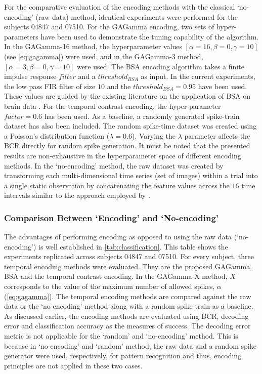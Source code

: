 For the comparative evaluation of the encoding methods with the classical `no-encoding' (raw data) method, identical experiments were performed for the subjects 04847 and 07510. For the GAGamma encoding, two sets of hyper-parameters have been used to demonstrate the tuning capability of the algorithm. In the GAGamma-16  method, the hyperparameter values $[\alpha=16, \beta=0, \gamma=10]$ (see \equationname \ref{eq:gagamma}) were used, and in the GAGamma-3 method, $[\alpha=3, \beta=0, \gamma=10]$ were used. The BSA encoding algorithm takes a finite impulse response $filter$ and a $threshold_{BSA}$ as input. In the current experiments, the low pass FIR filter of size $10$ and the $threshold_{BSA}=0.95$ have been used. These values are guided by the existing literature on the application of BSA on brain data \citep{nuntalid2011eeg}. For the temporal contrast encoding, the hyper-parameter $factor=0.6$ has been used. As a baseline, a randomly generated spike-train dataset has also been included. The random spike-time dataset was created using a Poisson's distribution function ($\lambda=0.6$). Varying the $\lambda$ parameter affects the BCR directly for random spike generation. It must be noted that the presented results are non-exhaustive in the hyperparameter space of different encoding methods. In the `no-encoding' method, the raw dataset was created by transforming each multi-dimensional time series (set of images) within a trial into a single static observation by concatenating the feature values across the $16$ time intervals similar to the approach employed by \citet{mitchell2003classifying}. 



\subsubsection{Comparison Between `Encoding' and `No-encoding'} The advantages of performing encoding as opposed to using the raw data (`no-encoding') is well established in \tablename \ref{tab:classification}. This table shows the experiments replicated across subjects 04847 and 07510. For every subject, three temporal encoding methods were evaluated. They are the proposed GAGamma, BSA and the temporal contrast encoding. In the GAGamma-X method, $X$ corresponds to the value of the maximum number of allowed spikes, $\alpha$ (\equationname \ref{eq:gagamma}). The temporal encoding methods are compared against the raw data or the `no-encoding' method along with a random spike-train as a baseline. As discussed earlier, the encoding methods are evaluated using BCR, decoding error and classification accuracy as the measures of success. The decoding error metric is not applicable for the `random' and `no-encoding' method. This is because in `no-encoding' and `random' method, the raw data and a random spike generator were used, respectively, for pattern recognition and thus, encoding principles are not applied in these two cases. 
	
